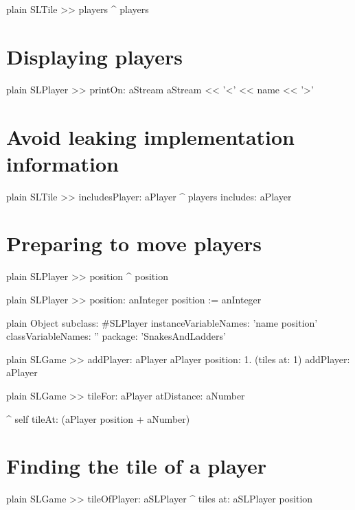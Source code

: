 \documentclass[10pt,twoside,english]{_support/latex/sbabook/sbabook}
\begin{document}
\begin{displaycode}{plain}
SLTile >> players 
	^ players
\end{displaycode}
\section{Displaying players}
\begin{displaycode}{plain}
SLPlayer >> printOn: aStream
	aStream << '<' << name << '>'
\end{displaycode}
\section{Avoid leaking implementation information}
\begin{displaycode}{plain}
SLTile >> includesPlayer: aPlayer
	^ players includes: aPlayer
\end{displaycode}
\section{Preparing to move players}
\begin{displaycode}{plain}
SLPlayer >> position
	^ position
\end{displaycode}

\begin{displaycode}{plain}
SLPlayer >> position: anInteger 
	position := anInteger
\end{displaycode}

\begin{displaycode}{plain}
Object subclass: #SLPlayer
	instanceVariableNames: 'name position'
	classVariableNames: ''
	package: 'SnakesAndLadders'
\end{displaycode}

\begin{displaycode}{plain}
SLGame >> addPlayer: aPlayer
	aPlayer position: 1.
	(tiles at: 1) addPlayer: aPlayer
\end{displaycode}

\begin{displaycode}{plain}
SLGame >> tileFor: aPlayer atDistance: aNumber
	
	^ self tileAt: (aPlayer position + aNumber)
\end{displaycode}
\section{Finding the tile of a player}
\begin{displaycode}{plain}
SLGame >> tileOfPlayer: aSLPlayer 
	^ tiles at: aSLPlayer position
\end{displaycode}
\end{document}
